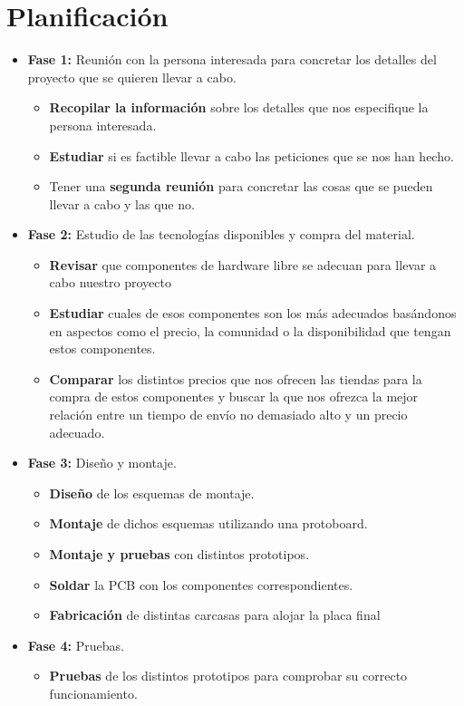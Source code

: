 \section{Planificación}

\begin{itemize}
	\item\textbf{Fase 1: } Reunión con la persona interesada para concretar los detalles del proyecto que se quieren llevar a cabo.
	\begin{itemize}
		\item\textbf{Recopilar la información}  sobre los detalles que nos especifique la persona interesada.
		\item\textbf{Estudiar}  si es factible llevar a cabo las peticiones que se nos han hecho.
		\item Tener una \textbf{segunda reunión} para concretar las cosas que se pueden llevar a cabo y las que no.
	\end{itemize}
	\item\textbf{Fase 2: } Estudio de las tecnologías disponibles y compra del material.
	\begin{itemize}
		\item\textbf{Revisar}  que componentes de hardware libre se adecuan para llevar a cabo nuestro proyecto
		\item\textbf{Estudiar}  cuales de esos componentes son los más adecuados basándonos en aspectos como el precio, la comunidad o la disponibilidad que tengan estos componentes.
		\item\textbf{Comparar} los distintos precios que nos ofrecen las tiendas para la compra de estos componentes y buscar la que nos ofrezca la mejor relación entre un tiempo de envío no demasiado alto y un precio adecuado.
	\end{itemize}
	\item\textbf{Fase 3: } Diseño y montaje.
	\begin{itemize}
		\item\textbf{Diseño}  de los esquemas de montaje.
		\item\textbf{Montaje}  de dichos esquemas utilizando una protoboard\cite{protoboard}.
		\item\textbf{Montaje y pruebas} con distintos prototipos.
		\item\textbf{Soldar} la PCB con los componentes correspondientes.
		\item\textbf{Fabricación} de distintas carcasas para alojar la placa final
	\end{itemize}
	\item\textbf{Fase 4: } Pruebas.
	\begin{itemize}
		\item\textbf{Pruebas}  de los distintos prototipos para comprobar su correcto funcionamiento.
	\end{itemize}
	
\end{itemize}


